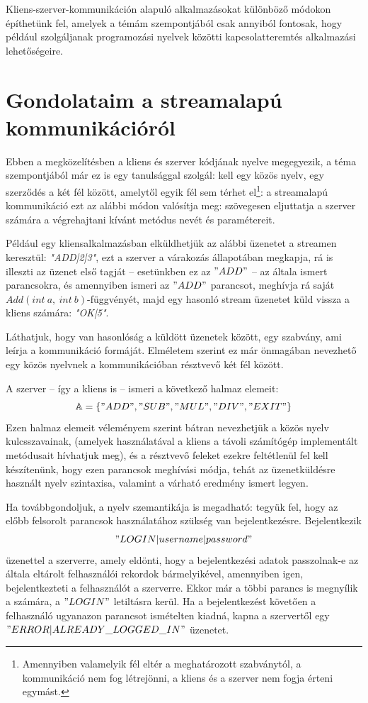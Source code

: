 \documentclass[tocnopagenum]{thesis-ekf}
\begin{document}
	Kliens-szerver-kommunikáción alapuló alkalmazásokat különböző módokon építhetünk fel, amelyek a témám szempontjából csak annyiból fontosak, hogy például szolgáljanak programozási nyelvek közötti kapcsolatteremtés alkalmazási lehetőségeire.
	\section{Gondolataim a streamalapú kommunikációról}
	Ebben a megközelítésben a kliens és szerver kódjának nyelve megegyezik, a téma szempontjából már ez is egy tanulsággal szolgál: kell egy közös nyelv, egy szerződés a két fél között, amelytől egyik fél sem térhet el\footnote{Amennyiben valamelyik fél eltér a meghatározott szabványtól, a kommunikáció nem fog létrejönni, a kliens és a szerver nem fogja érteni egymást.}: a streamalapú kommunikáció ezt az alábbi módon valósítja meg: szövegesen eljuttatja a szerver számára a végrehajtani kívánt metódus nevét és paramétereit.
	
	Például egy kliensalkalmazásban elküldhetjük az alábbi üzenetet a streamen keresztül: \textit{"ADD|2|3"}, ezt a szerver a várakozás állapotában megkapja, rá is illeszti az üzenet első tagját -- esetünkben ez az $"ADD"$ -- az általa ismert parancsokra, és amennyiben ismeri az $"ADD"$ parancsot, meghívja rá saját $Add(int\ a,\ int\ b)$-függvényét, majd egy hasonló stream üzenetet küld vissza a kliens számára: \textit{"OK|5"}. \cite{elearning_stream}
	
	Láthatjuk, hogy van hasonlóság a küldött üzenetek között, egy szabvány, ami leírja a kommunikáció formáját. Elméletem szerint ez már önmagában nevezhető egy közös nyelvnek a kommunikációban résztvevő két fél között. 
	
	A szerver -- így a kliens is -- ismeri a következő halmaz elemeit: $$\mathbb{A} = \{"ADD", "SUB", "MUL", "DIV", "EXIT"\}$$
	Ezen halmaz elemeit véleményem szerint bátran nevezhetjük a közös nyelv kulcsszavainak, (amelyek használatával a kliens a távoli számítógép implementált metódusait hívhatjuk meg), és a résztvevő feleket ezekre feltétlenül fel kell készítenünk, hogy ezen parancsok meghívási módja, tehát az üzenetküldésre használt nyelv szintaxisa, valamint a várható eredmény ismert legyen.
	
	Ha továbbgondoljuk, a nyelv szemantikája is megadható: tegyük fel, hogy az előbb felsorolt parancsok használatához szükség van bejelentkezésre. Bejelentkezik $$"LOGIN|username|password"$$ üzenettel a szerverre, amely eldönti, hogy a bejelentkezési adatok passzolnak-e az általa eltárolt felhasználói rekordok bármelyikével, amennyiben igen, bejelentkezteti a felhasználót a szerverre. Ekkor már a többi parancs is megnyílik a számára, a $"LOGIN"$ letiltásra kerül. Ha a bejelentkezést követően a felhasználó ugyanazon parancsot ismételten kiadná, kapna a szervertől egy $"ERROR|ALREADY\_LOGGED\_IN"$ üzenetet.
	
\end{document}
